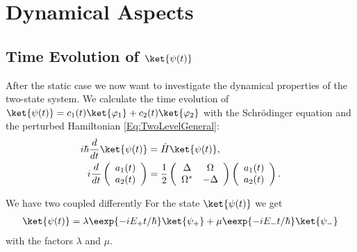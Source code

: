\section{Dynamical Aspects}
\subsection{Time Evolution of $\ket{\psi(t)}$}
 After the static case we now want to investigate the dynamical properties of the two-state system. We calculate the time evolution of $\ket{\psi(t)} = c_1(t)\ket{\varphi_1} + c_2(t)\ket{\varphi_2}$ with the Schrödinger equation and the perturbed Hamiltonian \eqref{Eq:TwoLevelGeneral}:
\begin{align}
i\hbar \frac{d}{dt}\ket{\psi(t)}&=\hat{H}\ket{\psi(t)},\\
i \frac{d}{dt}\left(\begin{array}{c} a_1(t) \\ a_2(t) \end{array}\right) &= \frac{1}{2}\left( \begin{array}{cc} \Delta & \Omega \\ \Omega^* & -\Delta \end{array} \right) \left(\begin{array}{c} a_1(t) \\ a_2(t) \end{array} \right).
\end{align}

We have two coupled differently
For the state $\ket{\psi(t)}$ we get
				\begin{align}
					\ket{\psi(t)}=\lambda \eexp{-i{E_+}t/{\hbar}} \ket{\psi_+} + \mu \eexp{-i{E_-}t/{\hbar}} \ket{\psi_-} \label{eq:psitimeevolution}
				\end{align}
				with the factors $\lambda$ and $\mu$.

